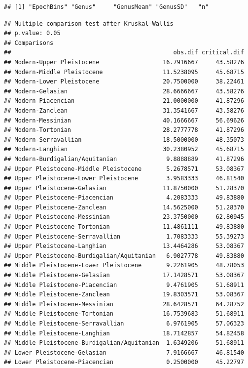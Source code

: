 \documentclass[]{article}
\begin{document}
\begin{verbatim}
## [1] "EpochBins" "Genus"     "GenusMean" "GenusSD"   "n"
\end{verbatim}

\begin{verbatim}
## Multiple comparison test after Kruskal-Wallis 
## p.value: 0.05 
## Comparisons
##                                              obs.dif critical.dif
## Modern-Upper Pleistocene                  16.7916667     43.58276
## Modern-Middle Pleistocene                 11.5238095     45.68715
## Modern-Lower Pleistocene                  20.7500000     38.22461
## Modern-Gelasian                           28.6666667     43.58276
## Modern-Piacencian                         21.0000000     41.87296
## Modern-Zanclean                           31.3541667     43.58276
## Modern-Messinian                          40.1666667     56.69626
## Modern-Tortonian                          28.2777778     41.87296
## Modern-Serravallian                       18.5000000     48.35073
## Modern-Langhian                           30.2380952     45.68715
## Modern-Burdigalian/Aquitanian              9.8888889     41.87296
## Upper Pleistocene-Middle Pleistocene       5.2678571     53.08367
## Upper Pleistocene-Lower Pleistocene        3.9583333     46.81540
## Upper Pleistocene-Gelasian                11.8750000     51.28370
## Upper Pleistocene-Piacencian               4.2083333     49.83880
## Upper Pleistocene-Zanclean                14.5625000     51.28370
## Upper Pleistocene-Messinian               23.3750000     62.80945
## Upper Pleistocene-Tortonian               11.4861111     49.83880
## Upper Pleistocene-Serravallian             1.7083333     55.39273
## Upper Pleistocene-Langhian                13.4464286     53.08367
## Upper Pleistocene-Burdigalian/Aquitanian   6.9027778     49.83880
## Middle Pleistocene-Lower Pleistocene       9.2261905     48.78053
## Middle Pleistocene-Gelasian               17.1428571     53.08367
## Middle Pleistocene-Piacencian              9.4761905     51.68911
## Middle Pleistocene-Zanclean               19.8303571     53.08367
## Middle Pleistocene-Messinian              28.6428571     64.28752
## Middle Pleistocene-Tortonian              16.7539683     51.68911
## Middle Pleistocene-Serravallian            6.9761905     57.06323
## Middle Pleistocene-Langhian               18.7142857     54.82458
## Middle Pleistocene-Burdigalian/Aquitanian  1.6349206     51.68911
## Lower Pleistocene-Gelasian                 7.9166667     46.81540
## Lower Pleistocene-Piacencian               0.2500000     45.22797

\end{verbatim}
\end{document}
